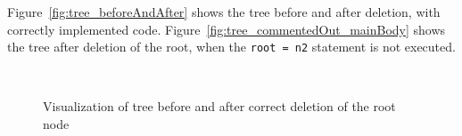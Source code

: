     Figure~\vref{fig:tree_beforeAndAfter} shows the tree
    before and after deletion, with correctly implemented code.
    Figure~\vref{fig:tree_commentedOut_mainBody} shows the tree after deletion of the
    root, when the \texttt{root = n2} statement is not executed.

    \begin{figure}[H]
    \centering
    \mbox{
        \label{fig:tree_correct_pre}
        \label{fig:tree_correct_mainBody}     
        }
    \caption[Visualization of tree]{Visualization of tree before and after correct deletion of the root node}
    \label{fig:tree_beforeAndAfter}
    \end{figure}

